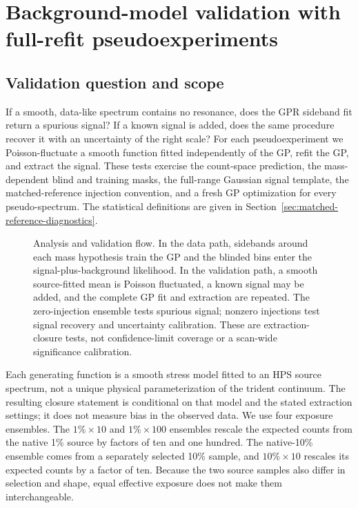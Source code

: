 
\section{Background-model validation with full-refit pseudoexperiments}
\label{sec:toys}

\subsection{Validation question and scope}

If a smooth, data-like spectrum contains no resonance, does the GPR sideband fit return
a spurious signal? If a known signal is added, does the same procedure recover it with
an uncertainty of the right scale? For each pseudoexperiment we Poisson-fluctuate a
smooth function fitted independently of the GP, refit the GP, and extract the signal.
These tests exercise the count-space prediction,
the mass-dependent blind and training masks, the full-range Gaussian signal
template, the matched-reference injection convention, and a fresh GP optimization
for every pseudo-spectrum. The statistical definitions are given in
Section~\ref{sec:matched-reference-diagnostics}.

\begin{figure}[htbp]
\centering
{}
\caption{Analysis and validation flow.  In the data path, sidebands around each mass
hypothesis train the GP and the blinded bins enter the signal-plus-background
likelihood.  In the validation path, a smooth source-fitted mean is Poisson
fluctuated, a known signal may be added, and the complete GP fit and extraction are
repeated.  The zero-injection ensemble tests spurious signal; nonzero injections test
signal recovery and uncertainty calibration.  These are extraction-closure tests,
not confidence-limit coverage or a scan-wide significance calibration.}
\label{fig:v491-hps-gpr-flowchart}
\end{figure}

Each generating function is a smooth stress model fitted to an HPS source spectrum,
not a unique physical parameterization of the trident continuum. The resulting closure
statement is conditional on that model and the stated extraction settings; it does not
measure bias in the observed data. We use four exposure ensembles. The
$1\%\times10$ and $1\%\times100$ ensembles rescale the expected counts from the native
1\% source by factors of ten and one hundred. The native-10\% ensemble comes from a
separately selected 10\% sample, and $10\%\times10$ rescales its expected counts by a
factor of ten. Because the two source samples also differ in selection and shape, equal
effective exposure does not make them interchangeable.


